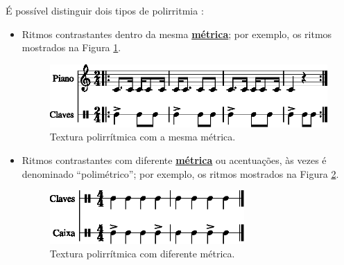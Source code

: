 É possível distinguir dois tipos de polirritmia \cite[pp. 687]{apel1969harvard}:
\begin{itemize}
\item Ritmos contrastantes dentro da mesma \hyperref[def:Metrica]{\textbf{métrica}};
por exemplo, os ritmos mostrados na Figura \ref{fig:polirritmia1-1}.
\begin{figure}[!h]
\centering
    \includegraphics[width=\textwidth]{chapters/cap-musicalidade-percepcion/polirritmia1-1.eps}
  \caption{Textura polirrítmica com a mesma métrica.}
\label{fig:polirritmia1-1}
\end{figure}
\item Ritmos contrastantes com diferente \hyperref[def:Metrica]{\textbf{métrica}} ou acentuações, 
às vezes é denominado ``polimétrico'';
por exemplo, os ritmos mostrados na Figura \ref{fig:polirritmia2-1}.
\begin{figure}[!h]
\centering
    \includegraphics[width=0.7\textwidth]{chapters/cap-musicalidade-percepcion/polirritmia2-1.eps}
  \caption{Textura polirrítmica com diferente métrica.}
\label{fig:polirritmia2-1}
\end{figure}
\end{itemize}


